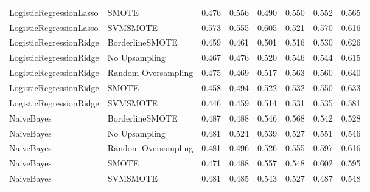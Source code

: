 \begin{tabular}{llllllll}
     LogisticRegressionLasso &               SMOTE & 0.476 &                     0.556 &                 0.490 &                  0.550 &                                   0.552 &     0.565 \\
     LogisticRegressionLasso &            SVMSMOTE & 0.573 &                     0.555 &                 0.605 &                  0.521 &                                   0.570 &     0.616 \\
     LogisticRegressionRidge &     BorderlineSMOTE & 0.459 &                     0.461 &                 0.501 &                  0.516 &                                   0.530 &     0.626 \\
     LogisticRegressionRidge &       No Upsampling & 0.467 &                     0.476 &                 0.520 &                  0.546 &                                   0.544 &     0.615 \\
     LogisticRegressionRidge & Random Oversampling & 0.475 &                     0.469 &                 0.517 &                  0.563 &                                   0.560 &     0.640 \\
     LogisticRegressionRidge &               SMOTE & 0.458 &                     0.494 &                 0.522 &                  0.532 &                                   0.550 &     0.633 \\
     LogisticRegressionRidge &            SVMSMOTE & 0.446 &                     0.459 &                 0.514 &                  0.531 &                                   0.535 &     0.581 \\
                  NaiveBayes &     BorderlineSMOTE & 0.487 &                     0.488 &                 0.546 &                  0.568 &                                   0.542 &     0.528 \\
                  NaiveBayes &       No Upsampling & 0.481 &                     0.524 &                 0.539 &                  0.527 &                                   0.551 &     0.546 \\
                  NaiveBayes & Random Oversampling & 0.481 &                     0.496 &                 0.526 &                  0.555 &                                   0.597 &     0.616 \\
                  NaiveBayes &               SMOTE & 0.471 &                     0.488 &                 0.557 &                  0.548 &                                   0.602 &     0.595 \\
                  NaiveBayes &            SVMSMOTE & 0.481 &                     0.485 &                 0.543 &                  0.527 &                                   0.487 &     0.548 \\

\end{tabular}
